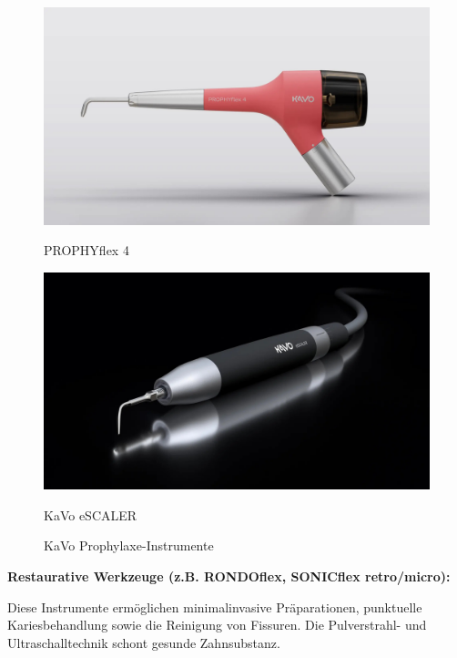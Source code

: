 \begin{figure}[H]
  \centering
  \begin{minipage}[b]{0.45\textwidth}
    \centering
    \includegraphics[width=\textwidth]{images/PROPHYflex-4-flaming_light_3000px.jpg}
    \caption*{PROPHYflex 4}
  \end{minipage}
  \hspace{0.05\textwidth}
  \begin{minipage}[b]{0.45\textwidth}
    \centering
    \includegraphics[width=\textwidth]{images/KaVo-eScaler-Ultrasonic-Scaler-Header_16-9.jpg}
    \caption*{KaVo eSCALER}
  \end{minipage}
  \caption{KaVo Prophylaxe-Instrumente}
  \label{fig:Prophylaxe-Instrumente}
\end{figure}
\vspace{1em}

\textbf{Restaurative Werkzeuge (z.B. RONDOflex, SONICflex retro/micro):}

Diese Instrumente ermöglichen minimalinvasive Präparationen, punktuelle Kariesbehandlung sowie die Reinigung von Fissuren. Die Pulverstrahl- und Ultraschalltechnik schont gesunde Zahnsubstanz.

